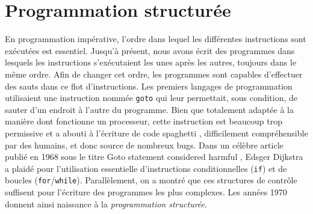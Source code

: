 \documentclass{magnoliaold}
\begin{document}







\section{Programmation structurée}

En programmation impérative, l'ordre dans lequel les différentes instructions sont
exécutées est essentiel. Jusqu'à présent, nous avons écrit des programmes dans lesquels
les instructions s'exécutaient les unes après les autres, toujours dans le même ordre.
Afin de changer cet ordre, les programmes sont
capables d'effectuer des sauts dans ce flot d'instructions. Les premiers langages de
programmation utilisaient une instruction nommée \verb_goto_ qui leur permettait,
sous condition, de sauter d'un endroit à l'autre du programme. Bien que totalement
adaptée à la manière dont fonctionne un processeur, cette instruction est beaucoup trop
permissive et a abouti à l'écriture de \og code spaghetti \fg, difficilement
compréhensible par des humains, et donc source de nombreux bugs.
Dans un célèbre article publié en 1968 sous le titre \og Goto statement considered harmful \fg,
Edsger Dijkstra a plaidé pour l'utilisation essentielle
d'instructions conditionnelles (\verb_if_) et de boucles (\verb_for_/\verb_while_).
Parallèlement, on a montré que ces structures de contrôle suffisent pour l'écriture des
programmes les plus complexes. Les années 1970 donnent ainsi naissance à la
\emph{programmation structurée}.
\end{document}
